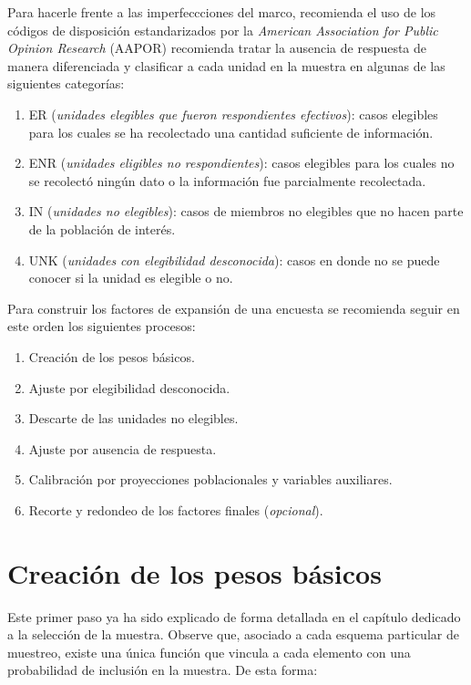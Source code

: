 \documentclass[
  12pt,
  spanish,
]{book}
\providecommand{\tightlist}{%
  \setlength{\itemsep}{0pt}\setlength{\parskip}{0pt}}
\begin{document}
Para hacerle frente a las imperfeccciones del marco, \citet{Valliant_Dever_2017} recomienda el uso de los códigos de disposición estandarizados por la \emph{American Association for Public Opinion Research} (AAPOR) recomienda tratar la ausencia de respuesta de manera diferenciada y clasificar a cada unidad en la muestra en algunas de las siguientes categorías:

\begin{enumerate}
\def\labelenumi{\arabic{enumi}.}
\tightlist
\item
  ER (\emph{unidades elegibles que fueron respondientes efectivos}): casos elegibles para los cuales se ha recolectado una cantidad suficiente de información.
\item
  ENR (\emph{unidades eligibles no respondientes}): casos elegibles para los cuales no se recolectó ningún dato o la información fue parcialmente recolectada.
\item
  IN (\emph{unidades no elegibles}): casos de miembros no elegibles que no hacen parte de la población de interés.
\item
  UNK (\emph{unidades con elegibilidad desconocida}): casos en donde no se puede conocer si la unidad es elegible o no.
\end{enumerate}

Para construir los factores de expansión de una encuesta se recomienda seguir en este orden los siguientes procesos:

\begin{enumerate}
\def\labelenumi{\arabic{enumi}.}
\tightlist
\item
  Creación de los pesos básicos.
\item
  Ajuste por elegibilidad desconocida.
\item
  Descarte de las unidades no elegibles.
\item
  Ajuste por ausencia de respuesta.
\item
  Calibración por proyecciones poblacionales y variables auxiliares.
\item
  Recorte y redondeo de los factores finales (\emph{opcional}).
\end{enumerate}

\hypertarget{creaciuxf3n-de-los-pesos-buxe1sicos}{%
\section{Creación de los pesos básicos}\label{creaciuxf3n-de-los-pesos-buxe1sicos}}

Este primer paso ya ha sido explicado de forma detallada en el capítulo dedicado a la selección de la muestra. Observe que, asociado a cada esquema particular de muestreo, existe una única función que vincula a cada elemento con una probabilidad de inclusión en la muestra. De esta forma:
\end{document}
